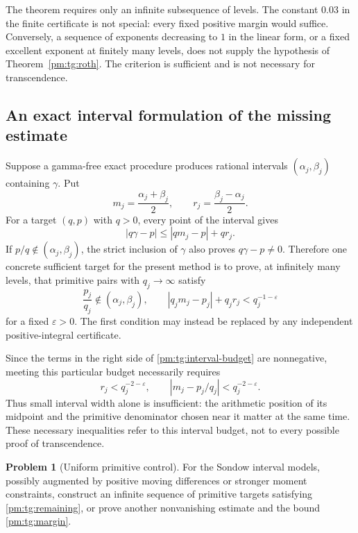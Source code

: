 \documentclass[11pt,a4paper]{article}
\theoremstyle{definition}
\newtheorem{problem}[theorem]{Problem}
\theoremstyle{remark}
\numberwithin{equation}{section}
\begin{document}
The theorem requires only an infinite subsequence of levels.  The constant
$0.03$ in the finite certificate is not special: every fixed positive
margin would suffice.  Conversely, a sequence of exponents decreasing to
$1$ in the linear form, or a fixed excellent exponent at finitely many
levels, does not supply the hypothesis of Theorem~\ref{pm:tg:roth}.
The criterion is sufficient and is not necessary for transcendence.

\subsection{An exact interval formulation of the missing estimate}

Suppose a gamma-free exact procedure produces rational intervals
$(\alpha_j,\beta_j)$ containing $\gamma$.  Put
\[
 m_j=\frac{\alpha_j+\beta_j}2,\qquad
 r_j=\frac{\beta_j-\alpha_j}2.
\]
For a target $(q,p)$ with $q>0$, every point of the interval gives
\begin{equation}\label{pm:tg:interval-budget}
 |q\gamma-p|\le |qm_j-p|+q r_j.
\end{equation}
If $p/q\notin(\alpha_j,\beta_j)$, the strict inclusion of $\gamma$
also proves $q\gamma-p\ne0$.  Therefore one concrete sufficient target
for the present method is to prove, at infinitely many levels, that
primitive pairs with $q_j\to\infty$ satisfy
\begin{equation}\label{pm:tg:remaining}
 \frac{p_j}{q_j}\notin(\alpha_j,\beta_j),\qquad
 |q_jm_j-p_j|+q_jr_j<q_j^{-1-\varepsilon}
\end{equation}
for a fixed $\varepsilon>0$.  The first condition may instead be replaced
by any independent positive-integral certificate.

Since the terms in the right side of \eqref{pm:tg:interval-budget} are
nonnegative, meeting this particular budget necessarily requires
\[
 r_j<q_j^{-2-\varepsilon},\qquad
 |m_j-p_j/q_j|<q_j^{-2-\varepsilon}.
\]
Thus small interval width alone is insufficient: the arithmetic position
of its midpoint and the primitive denominator chosen near it matter at
the same time.  These necessary inequalities refer to this interval
budget, not to every possible proof of transcendence.

\begin{problem}[Uniform primitive control]\label{pm:tg:problem}
For the Sondow interval models, possibly augmented by positive moving
differences or stronger moment constraints, construct an infinite
sequence of primitive targets satisfying \eqref{pm:tg:remaining}, or prove
another nonvanishing estimate and the bound \eqref{pm:tg:margin}.
\end{problem}
\end{document}
